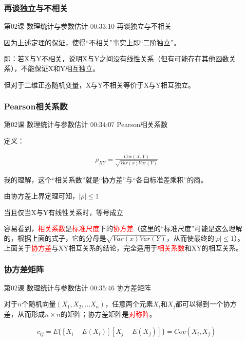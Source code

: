 \documentclass[UTF8]{ctexart}
\begin{document}
\subsubsection{再谈独立与不相关}

第02课 数理统计与参数估计 00:33:10 再谈独立与不相关

因为上述定理的保证，使得“不相关”事实上即“二阶独立”。

即：若X与Y不相关，说明X与Y之间没有线性关系（但有可能存在其他函数关系），不能保证X和Y相互独立。

但对于二维正态随机变量，X与Y不相关等价于X与Y相互独立。

\subsubsection{Pearson相关系数}

第02课 数理统计与参数估计 00:34:07 Pearson相关系数

定义：

\begin{equation}
\begin{aligned}
\rho_{XY}=\frac{Cov(X,Y)}{\sqrt{Var(x)Var(Y)}}
\end{aligned}
\end{equation}

我的理解，这个“相关系数”就是“协方差”与“各自标准差乘积”的商。

由协方差上界定理可知，$|\rho| \leq 1 $

当且仅当X与Y有线性关系时，等号成立

容易看到，\textcolor{red}{相关系数}是\textcolor{red}{标准尺度}下的\textcolor{red}{协方差}（这里的“标准尺度”可能是这么理解的，根据上面的式子，它的分母是$\sqrt{Var(x)Var(Y)}$，从而使最终的$|\rho| \leq 1 $）。上面关于\textcolor{red}{协方差}与XY相互关系的结论，完全适用于\textcolor{red}{相关系数}和XY的相互关系。

\subsubsection{协方差矩阵}

第02课 数理统计与参数估计 00:35:46 协方差矩阵

对于$n$个随机向量$(X_{1},X_{2},\dots X_{n})$，任意两个元素$X_{i}$和$X_{j}$都可以得到一个协方差，从而形成$n \times n$的矩阵；协方差矩阵是\textcolor{red}{对称阵}。

\begin{equation}
\begin{aligned}
c_{ij}=E\{  [X_{i}-E(X_{i})][X_{j}-E(X_{j})]  \} = Cov(X_{i},X_{j}) \\
\end{aligned}
\end{equation}
\end{document}

